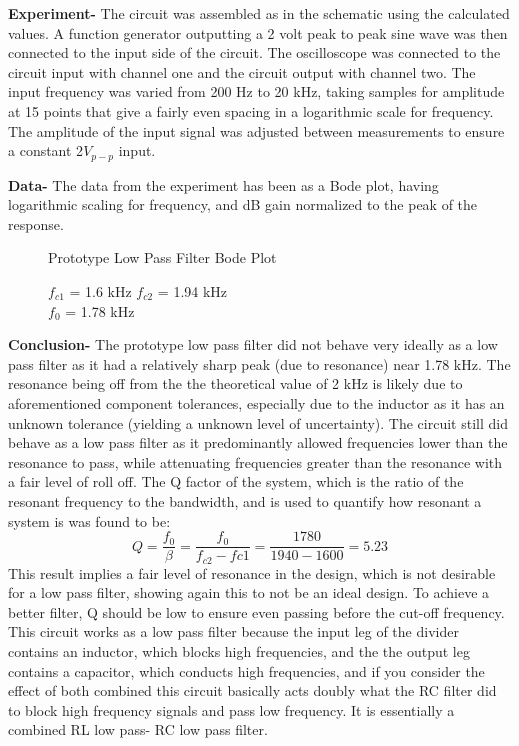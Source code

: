 \documentclass[12pt]{article}
\begin{document}
\textbf{Experiment-} The circuit was assembled as in the schematic using the calculated values. A function generator outputting a 2 volt peak to peak sine wave was then connected to the input side of the circuit. The oscilloscope was connected to the circuit input with channel one and the circuit output with channel two. The input frequency was varied from 200 Hz to 20 kHz, taking samples for amplitude at 15 points that give a fairly even spacing in a logarithmic scale for frequency. The amplitude of the input signal was adjusted between measurements to ensure a constant 2$V_{p-p}$ input.\\\par 
\pagebreak
\textbf{Data-} The data from the experiment has been as a Bode plot, having logarithmic scaling for frequency, and dB gain normalized to the peak of the response.
\begin{figure}[h!]
\begin{center}
    	\resizebox{0.6\textwidth}{!}{}
\end{center}
\caption{Prototype Low Pass Filter Bode Plot }
\caption*{$f_{c1}$ = 1.6 kHz $f_{c2}$ = 1.94 kHz \\ $f_{0}$ = 1.78 kHz}
\end{figure}
\FloatBarrier
\textbf{Conclusion-} The prototype low pass filter did not behave very ideally as a low pass filter as it had a relatively sharp peak (due to resonance) near 1.78 kHz. The resonance being off from the the theoretical value of 2 kHz is likely due to aforementioned component tolerances, especially due to the inductor as it has an unknown tolerance (yielding a unknown level of uncertainty). The circuit still did behave as a low pass filter as it predominantly allowed frequencies lower than the resonance to pass, while attenuating frequencies greater than the resonance with a fair level of roll off. The Q factor of the system, which is the ratio of the resonant frequency to the bandwidth, and is used to quantify how resonant a system is was found to be:
\begin{equation}
Q = \frac{f_0}{\beta}=\frac{f_0}{f_{c2}-f{c1}} = \frac{1780}{1940-1600} = 5.23
\end{equation}
This result implies a fair level of resonance in the design, which is not desirable for a low pass filter, showing again this to not be an ideal design. To achieve a better filter, Q should be low to ensure even passing before the cut-off frequency. This circuit works as a low pass filter because the input leg of the divider contains an inductor, which blocks high frequencies, and the the output leg contains a capacitor, which conducts high frequencies, and if you consider the effect of both combined this circuit basically acts doubly what the RC filter did to block high frequency signals and pass low frequency. It is essentially a combined RL low pass- RC low pass filter.
\end{document}
